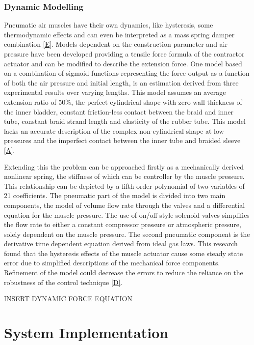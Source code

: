 \documentclass[11pt,a4paper]{article}
\begin{document}
\subsubsection{Dynamic Modelling}
\label{sub:dynamic_modelling}
Pneumatic air muscles have their own dynamics, like hysteresis, some thermodynamic effects and can even be interpreted as a mass spring damper combination \ref{E}. Models dependent on the construction parameter and air pressure have been developed providing a tensile force formula of the contractor actuator and can be modified to describe the extension force. One model based on a combination of sigmoid functions representing the force output as a function of both the air pressure and initial length, is an estimation derived from three experimental results over varying lengths. This model assumes an average extension ratio of 50\%, the perfect cylindrical shape with zero wall thickness of the inner bladder, constant friction-less contact between the braid and inner tube, constant braid strand length and elasticity of the rubber tube. This model lacks an accurate description of the complex non-cylindrical shape at low pressures and the imperfect contact between the inner tube and braided sleeve \ref{A}. \newline

Extending this the problem can be approached firstly as a mechanically derived nonlinear spring, the stiffness of which can be controller by the muscle pressure. This relationship can be depicted by a fifth order polynomial of two variables of 21 coefficients. The pneumatic part of the model is divided into two main components, the model of volume flow rate through the valves and a differential equation for the muscle pressure. The use of on/off style solenoid valves simplifies the flow rate to either a constant compressor pressure or atmospheric pressure, solely dependent on the muscle pressure. The second pneumatic component is the derivative time dependent equation derived from ideal gas laws. This research found that the hysteresis effects of the muscle actuator cause some steady state error due to simplified descriptions of the mechanical force components. Refinement of the model could decrease the errors to reduce the reliance on the robustness of the control technique \ref{D}.

\newline INSERT DYNAMIC FORCE EQUATION

\newpage
\section{System Implementation}
\label{sec:system_implementation}
\end{document}
